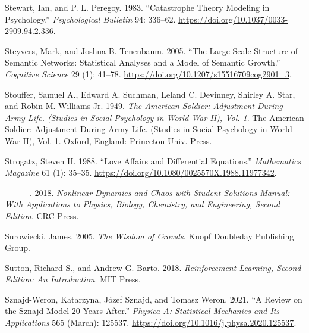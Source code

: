 \documentclass[
  a4paper,
  DIV=11,
  numbers=noendperiod]{scrreprt}
\newlength{\cslhangindent}
\newlength{\cslentryspacingunit} %
\newenvironment{CSLReferences}[2] %
 {%
  \setlength{\parindent}{0pt}
  \ifodd #1
  \let\oldpar\par
  \def\par{\hangindent=\cslhangindent\oldpar}
  \fi
  \setlength{\parskip}{#2\cslentryspacingunit}
 }%
 {}
\begin{document}
\begin{CSLReferences}{1}{0}
\leavevmode{}%
Stewart, Ian, and P. L. Peregoy. 1983. {``Catastrophe Theory Modeling in
Psychology.''} \emph{Psychological Bulletin} 94: 336--62.
\url{https://doi.org/10.1037/0033-2909.94.2.336}.

\leavevmode{}%
Steyvers, Mark, and Joshua B. Tenenbaum. 2005. {``The {Large-Scale
Structure} of {Semantic Networks}: {Statistical Analyses} and a {Model}
of {Semantic Growth}.''} \emph{Cognitive Science} 29 (1): 41--78.
\url{https://doi.org/10.1207/s15516709cog2901_3}.

\leavevmode{}%
Stouffer, Samuel A., Edward A. Suchman, Leland C. Devinney, Shirley A.
Star, and Robin M. Williams Jr. 1949. \emph{The {American} Soldier:
{Adjustment} During Army Life. ({Studies} in Social Psychology in {World
War II}), {Vol}. 1}. The {American} Soldier: {Adjustment} During Army
Life. ({Studies} in Social Psychology in {World War II}), {Vol}. 1.
{Oxford, England}: {Princeton Univ. Press}.

\leavevmode{}%
Strogatz, Steven H. 1988. {``Love {Affairs} and {Differential
Equations}.''} \emph{Mathematics Magazine} 61 (1): 35--35.
\url{https://doi.org/10.1080/0025570X.1988.11977342}.

\leavevmode{}%
---------. 2018. \emph{Nonlinear {Dynamics} and {Chaos} with {Student
Solutions Manual}: {With Applications} to {Physics}, {Biology},
{Chemistry}, and {Engineering}, {Second Edition}}. {CRC Press}.

\leavevmode{}%
Surowiecki, James. 2005. \emph{The {Wisdom} of {Crowds}}. {Knopf
Doubleday Publishing Group}.

\leavevmode{}%
Sutton, Richard S., and Andrew G. Barto. 2018. \emph{Reinforcement
{Learning}, Second Edition: {An Introduction}}. {MIT Press}.

\leavevmode{}%
Sznajd-Weron, Katarzyna, Józef Sznajd, and Tomasz Weron. 2021. {``A
Review on the {Sznajd} Model \textemdash{} 20 Years After.''}
\emph{Physica A: Statistical Mechanics and Its Applications} 565
(March): 125537. \url{https://doi.org/10.1016/j.physa.2020.125537}.


\end{CSLReferences}
\end{document}
